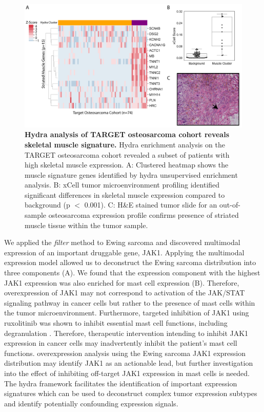 \documentclass[10pt,letterpaper]{article}
\begin{document}
%
%
\begin{figure}[!h]
	\includegraphics[width=\textwidth]{img/PNG/muscle-signature-genes-2x}
	\caption{{\bf Hydra analysis of TARGET osteosarcoma cohort reveals skeletal muscle signature.}
		 Hydra enrichment analysis on the TARGET osteosarcoma cohort revealed a subset of patients with high skeletal muscle expression. A: Clustered heatmap shows the muscle signature genes identified by hydra unsupervised enrichment analysis. B: xCell tumor microenvironment profiling identified significant differences in skeletal muscle expression compared to background (p $<$ 0.001). C: H\&E stained tumor slide for an out-of-sample osteosarcoma expression profile confirms presence of striated muscle tissue within the tumor sample.}
	\label{muscle}
\end{figure}

We applied the \textit{filter} method to Ewing sarcoma and discovered multimodal expression of an important druggable gene, JAK1. Applying the multimodal expression model allowed us to deconstruct the Ewing sarcoma distribution into three components (A). We found that the expression component with the highest JAK1 expression was also enriched for mast cell expression (B). Therefore, overexpression of JAK1 may not correspond to activation of the JAK/STAT signaling pathway in cancer cells but rather to the presence of mast cells within the tumor microenvironment. Furthermore, targeted inhibition of JAK1 using ruxolitinib was shown to inhibit essential mast cell functions, including degranulation \cite{hermansJAK1JAK2Inhibitor2018}. Therefore, therapeutic intervention intending to inhibit JAK1 expression in cancer cells may inadvertently inhibit the patient’s mast cell functions. overexpression analysis using the Ewing sarcoma JAK1 expression distribution may identify JAK1 as an actionable lead, but further investigation into the effect of inhibiting off-target JAK1 expression in mast cells is needed. The hydra framework facilitates the identification of important expression signatures which can be used to deconstruct complex tumor expression subtypes and identify potentially confounding expression signals.
\end{document}
